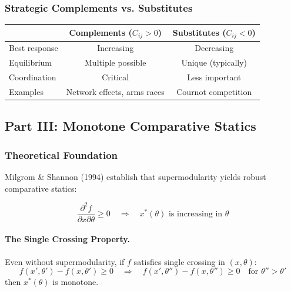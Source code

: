 \subsubsection{Strategic Complements vs. Substitutes}

\begin{center}
\renewcommand{\arraystretch}{1.3}
\begin{tabular}{|l|c|c|}
\hline
& \textbf{Complements} ($C_{ij} > 0$) & \textbf{Substitutes} ($C_{ij} < 0$) \\
\hline
Best response & Increasing & Decreasing \\
Equilibrium & Multiple possible & Unique (typically) \\
Coordination & Critical & Less important \\
Examples & Network effects, arms races & Cournot competition \\
\hline
\end{tabular}
\end{center}

\subsection{Part III: Monotone Comparative Statics}

\subsubsection{Theoretical Foundation}

Milgrom \& Shannon (1994) establish that supermodularity yields robust 
comparative statics:

\begin{equation}
\boxed{
\frac{\partial^2 f}{\partial x \partial \theta} \geq 0 \quad \Rightarrow \quad 
x^*(\theta) \text{ is increasing in } \theta
}
\label{eq:mr-mcs}
\end{equation}

\paragraph{The Single Crossing Property.}
Even without supermodularity, if $f$ satisfies single crossing in $(x, \theta)$:
\begin{equation}
f(x', \theta') - f(x, \theta') \geq 0 \quad \Rightarrow \quad 
f(x', \theta'') - f(x, \theta'') \geq 0 \quad \text{for } \theta'' > \theta'
\end{equation}
then $x^*(\theta)$ is monotone.


